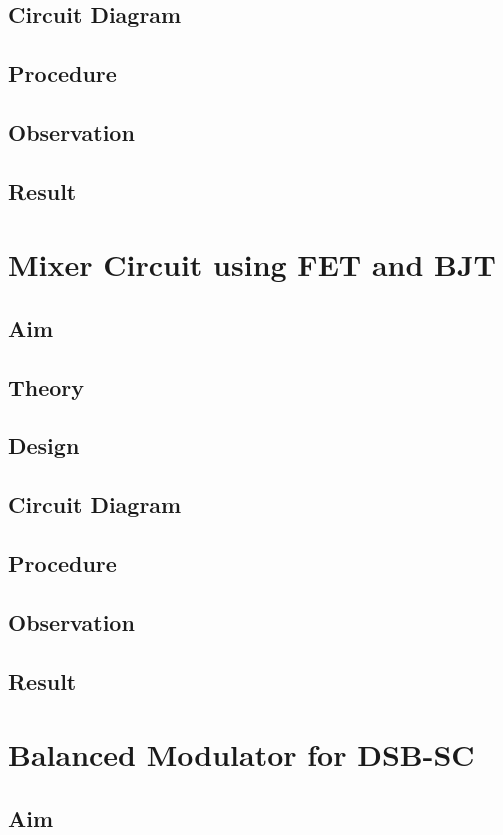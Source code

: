 \documentclass{book}
\begin{document}
\section*{Circuit Diagram}
\section*{Procedure}
\section*{Observation}
\section*{Result}

\chapter[Mixer Circuit using FET and BJT]{Mixer Circuit using FET and BJT}
\section*{Aim}
\section*{Theory}
\section*{Design}
\section*{Circuit Diagram}
\section*{Procedure}
\section*{Observation}
\section*{Result}

\chapter[Balanced Modulator for DSB-SC]{Balanced Modulator for DSB-SC}
\section*{Aim}
\end{document}
